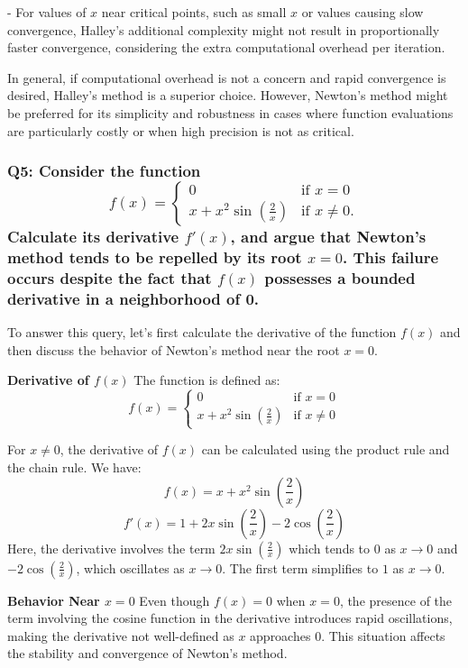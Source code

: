 \documentclass{article}
\begin{document}
- For values of \(x\) near critical points, such as small \(x\) or values causing slow convergence, Halley’s additional complexity might not result in proportionally faster convergence, considering the extra computational overhead per iteration.

In general, if computational overhead is not a concern and rapid convergence is desired, Halley's method is a superior choice. However, Newton's method might be preferred for its simplicity and robustness in cases where function evaluations are particularly costly or when high precision is not as critical.

\subsubsection*{Q5: Consider the function
\[ f(x) = \begin{cases} 
0 & \text{if } x = 0 \\
x + x^2 \sin\left(\frac{2}{x}\right) & \text{if } x \neq 0.
\end{cases} \]
Calculate its derivative \(f'(x)\), and argue that Newton’s method tends to be repelled by its root \(x = 0\). This failure occurs despite the fact that \(f(x)\) possesses a bounded derivative in a neighborhood of 0.}

To answer this query, let's first calculate the derivative of the function \(f(x)\) and then discuss the behavior of Newton's method near the root \(x = 0\).

\textbf{Derivative of \(f(x)\)}
The function is defined as:
\[
f(x) = \begin{cases} 
0 & \text{if } x = 0 \\
x + x^2 \sin\left(\frac{2}{x}\right) & \text{if } x \neq 0
\end{cases}
\]

For \(x \neq 0\), the derivative of \(f(x)\) can be calculated using the product rule and the chain rule. We have:
\[
f(x) = x + x^2 \sin\left(\frac{2}{x}\right)
\]
\[
f'(x) = 1 + 2x \sin\left(\frac{2}{x}\right) - 2 \cos\left(\frac{2}{x}\right)
\]
Here, the derivative involves the term \(2x \sin\left(\frac{2}{x}\right)\) which tends to \(0\) as \(x \to 0\) and \(-2 \cos\left(\frac{2}{x}\right)\), which oscillates as \(x \to 0\). The first term simplifies to \(1\) as \(x \to 0\).

\textbf{Behavior Near \(x = 0\)}
Even though \(f(x) = 0\) when \(x = 0\), the presence of the term involving the cosine function in the derivative introduces rapid oscillations, making the derivative not well-defined as \(x\) approaches \(0\). This situation affects the stability and convergence of Newton's method.
\end{document}
